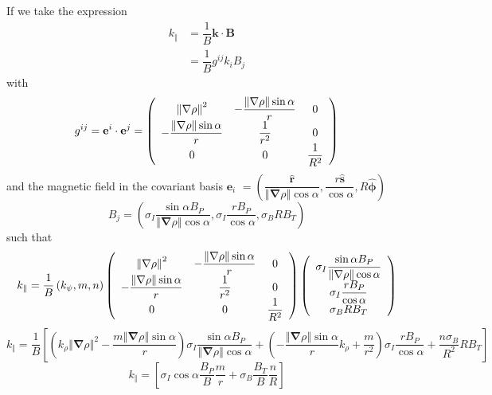 \documentclass[a4paper,12pt]{article}%
\begin{document}
If we take the expression
\begin{align}
k_{\Vert}  &  =\dfrac{1}{B}\mathbf{k}\cdot\mathbf{B}\\
&  =\dfrac{1}{B}g^{ij}k_{i}B_{j}%
\end{align}
with%
\begin{equation}
g^{ij}=\mathbf{e}^{i}\cdot\mathbf{e}^{j}=\left(
\begin{array}
[c]{ccc}%
\left\Vert \mathbf{\nabla}\rho\right\Vert ^{2} & -\dfrac{\left\Vert
\mathbf{\nabla}\rho\right\Vert \sin\alpha}{r} & 0\\
-\dfrac{\left\Vert \mathbf{\nabla}\rho\right\Vert \sin\alpha}{r} & \dfrac
{1}{r^{2}} & 0\\
0 & 0 & \dfrac{1}{R^{2}}%
\end{array}
\right)
\end{equation}
and the magnetic field in the covariant basis $\mathbf{e}_{i}$ $=\left(
\dfrac{\widehat{\mathbf{r}}}{\left\Vert \mathbf{\nabla}\rho\right\Vert
\cos\alpha},\dfrac{r\widehat{\mathbf{s}}}{\cos\alpha},R\widehat{\mathbf{\phi}%
}\right)  $
\begin{equation}
B_{j}=\left(  \sigma_{I}\dfrac{\sin\alpha B_{P}}{\left\Vert \mathbf{\nabla
}\rho\right\Vert \cos\alpha},\sigma_{I}\dfrac{rB_{P}}{\cos\alpha},\sigma
_{B}RB_{T}\right)
\end{equation}
such that
\begin{equation}
k_{\Vert}=\dfrac{1}{B}\left(  k_{\psi},m,n\right)  \left(
\begin{array}
[c]{ccc}%
\left\Vert \mathbf{\nabla}\rho\right\Vert ^{2} & -\dfrac{\left\Vert
\mathbf{\nabla}\rho\right\Vert \sin\alpha}{r} & 0\\
-\dfrac{\left\Vert \mathbf{\nabla}\rho\right\Vert \sin\alpha}{r} & \dfrac
{1}{r^{2}} & 0\\
0 & 0 & \dfrac{1}{R^{2}}%
\end{array}
\right)  \left(
\begin{array}
[c]{c}%
\sigma_{I}\dfrac{\sin\alpha B_{P}}{\left\Vert \mathbf{\nabla}\rho\right\Vert
\cos\alpha}\\
\sigma_{I}\dfrac{rB_{P}}{\cos\alpha}\\
\sigma_{B}RB_{T}%
\end{array}
\right)
\end{equation}%
\begin{equation}
k_{\Vert}=\dfrac{1}{B}\left[  \left(  k_{\rho}\left\Vert \mathbf{\nabla}%
\rho\right\Vert ^{2}-\dfrac{m\left\Vert \mathbf{\nabla}\rho\right\Vert
\sin\alpha}{r}\right)  \sigma_{I}\dfrac{\sin\alpha B_{P}}{\left\Vert
\mathbf{\nabla}\rho\right\Vert \cos\alpha}+\left(  -\dfrac{\left\Vert
\mathbf{\nabla}\rho\right\Vert \sin\alpha}{r}k_{\rho}+\dfrac{m}{r^{2}}\right)
\sigma_{I}\dfrac{rB_{P}}{\cos\alpha}+\dfrac{n\sigma_{B}}{R^{2}}RB_{T}\right]
\end{equation}%
\begin{equation}
k_{\Vert}=\left[  \sigma_{I}\cos\alpha\dfrac{B_{P}}{B}\dfrac{m}{r}+\sigma
_{B}\dfrac{B_{T}}{B}\dfrac{n}{R}\right]
\end{equation}
\end{document}
